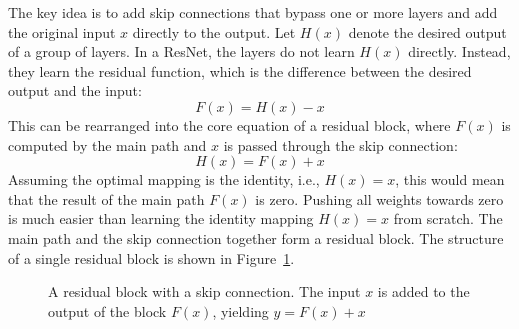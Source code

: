 \documentclass[
12pt,
fancyheadings,
a4paper,
twoside,
BCOR=0.7cm,
nobcorignoretitle,
grayscalebody,
]{stsreprt}
\begin{document}
The key idea is to add skip connections that bypass one or more layers and add the original input
$x$ directly to the output.
Let $H(x)$ denote the desired output of a group of layers. In a ResNet, the layers do not learn
$H(x)$ directly. Instead, they learn the residual function, which is the difference between the
desired output and the input:
\begin{equation}
        F(x) = H(x) - x
\end{equation}
This can be rearranged into the core equation of a residual block, where $F(x)$ is computed by the
main path and $x$ is passed through the skip connection:
\begin{equation}
        H(x) = F(x) + x
\end{equation}
Assuming the optimal mapping is the identity, i.e., $H(x) = x$, this would mean that the result of
the main path $F(x)$ is zero. Pushing all weights towards zero is much easier than learning the
identity mapping $H(x) = x$ from scratch.
The main path and the skip connection together form a residual block. The structure of a single
residual block is shown in Figure~\ref{fig:resnet}.

\begin{figure}[ht!]
    \centering
    \caption{A residual block with a skip connection. The input $x$ is added to the output of the block $F(x)$, yielding $y = F(x) + x$}
    \label{fig:resnet}
\end{figure}
\end{document}
